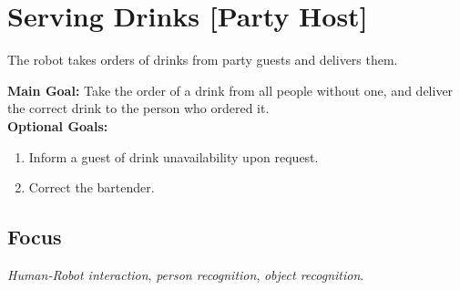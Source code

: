 \section{Serving Drinks [Party Host]}
\label{test:serving-drinks}
The robot takes orders of drinks from party guests and delivers them.



\noindent \textbf{Main Goal:} Take the order of a drink from all people without one, and deliver the correct drink to the person who ordered it.\\

\noindent \textbf{Optional Goals:}
\begin{enumerate}[nosep]
	\item Inform a guest of drink unavailability upon request.
	\item Correct the bartender.
\end{enumerate}

\subsection*{Focus}
\emph{Human-Robot interaction}, \emph{person recognition}, \emph{object recognition}.



